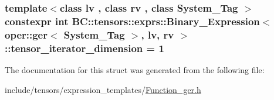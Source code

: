 \subsubsection[{\texorpdfstring{tensor\+\_\+iterator\+\_\+dimension}{tensor_iterator_dimension}}]{\setlength{\rightskip}{0pt plus 5cm}template$<$class lv , class rv , class System\+\_\+\+Tag $>$ constexpr int {\bf B\+C\+::tensors\+::exprs\+::\+Binary\+\_\+\+Expression}$<$ {\bf oper\+::ger}$<$ System\+\_\+\+Tag $>$, lv, rv $>$\+::tensor\+\_\+iterator\+\_\+dimension = 1\hspace{0.3cm}{\ttfamily [static]}}\hypertarget{structBC_1_1tensors_1_1exprs_1_1Binary__Expression_3_01oper_1_1ger_3_01System__Tag_01_4_00_01lv_00_01rv_01_4_a91e2694919251d815e3cd16b47698c3e}{}\label{structBC_1_1tensors_1_1exprs_1_1Binary__Expression_3_01oper_1_1ger_3_01System__Tag_01_4_00_01lv_00_01rv_01_4_a91e2694919251d815e3cd16b47698c3e}


The documentation for this struct was generated from the following file\+:\begin{DoxyCompactItemize}
\item 
include/tensors/expression\+\_\+templates/\hyperlink{Function__ger_8h}{Function\+\_\+ger.\+h}\end{DoxyCompactItemize}
